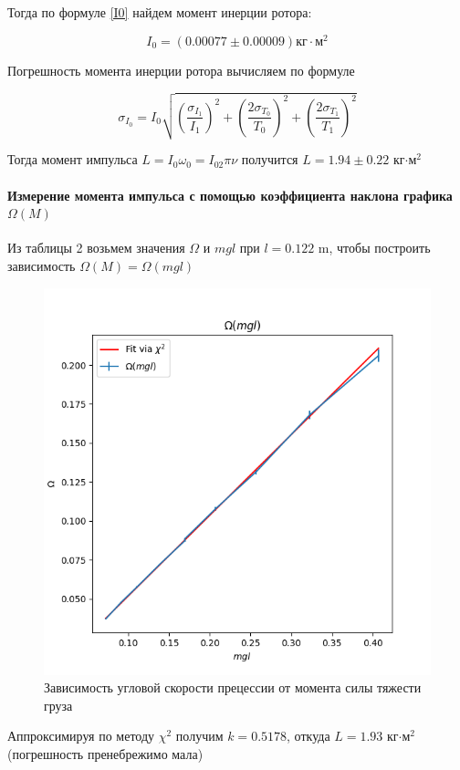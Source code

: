 \documentclass[a4paper,12pt]{article}
\begin{document}
	Тогда по формуле \eqref{I0} найдем момент инерции ротора:
	
	\[
		I_0=(0.00077\pm 0.00009) \text{кг}\cdot\text{м}^2
	\]
	
	Погрешность момента инерции ротора вычисляем по формуле
	
	\begin{equation}
		\label{sigmaI0}
		\sigma_{I_0}=I_0\sqrt{\left(\frac{\sigma_{I_1}}{I_1}\right)^2+ \left(\frac{2\sigma_{T_0}}{T_0}\right)^2+\left(\frac{2\sigma_{T_1}}{T_1}\right)^2}
	\end{equation}
	
	Тогда момент импульса $L=I_0\omega_0=I_02\pi\nu$ получится $L=1.94\pm 0.22$ кг$\cdot$м$^2$
	
	\paragraph{Измерение момента импульса с помощью коэффициента наклона графика $\Omega(M)$}
	
	Из таблицы 2 возьмем значения $\Omega$ и $mgl$ при $l = 0.122$ m, чтобы построить зависимость $\Omega(M)=\Omega(mgl)$\\
	
	\begin{figure}[H]
		\centering
		\includegraphics[width=0.7\linewidth]{fig2}
		\caption{Зависимость угловой скорости прецессии от момента силы тяжести груза}
		\label{fig:fig2}
	\end{figure}
	
	Аппроксимируя по методу $\chi^2$ получим $k = 0.5178$, откуда $L = 1.93$ кг$\cdot$м$^2$ (погрешность пренебрежимо мала)
	
\end{document}
